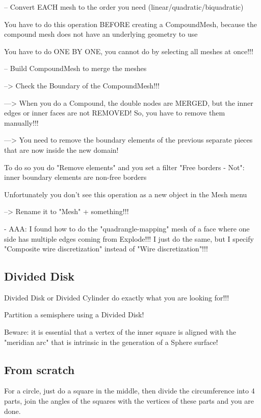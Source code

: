 \documentclass[10pt]{book}
\begin{document}
-- Convert EACH mesh to the order you need (linear/quadratic/biquadratic)

  You have to do this operation BEFORE creating a CompoundMesh,
  because the compound mesh does not have an underlying geometry to use 
   
  You have to do ONE BY ONE, you cannot do by selecting all meshes at once!!! 

  
-- Build CompoundMesh to merge the meshes

     --> Check the Boundary of the CompoundMesh!!! 
     
     ---> When you do a Compound, the double nodes are MERGED, but the inner edges or inner faces are not REMOVED! So, you have to remove them manually!!!
     
     ---> You need to remove the boundary elements of the previous separate pieces that are now inside the new domain!
     
          To do so you do "Remove elements" and you set a filter "Free borders - Not": inner boundary elements are non-free borders
          
          Unfortunately you don't see this operation as a new object in the Mesh menu
          
     --> Rename it to "Mesh" + something!!!
     
 
- AAA: I found how to do the "quadrangle-mapping" mesh of a face where one side has multiple edges coming from Explode!!! 
  I just do the same, but I specify "Composite wire discretization" instead of "Wire discretization"!!!
    
 

\subsection{Divided Disk}

Divided Disk or Divided Cylinder do exactly what you are looking for!!!

Partition a semisphere using a Divided Disk!

Beware: it is essential that a vertex of the inner square is aligned with the "meridian arc" that is intrinsic in the generation of a Sphere surface!

\subsection{From scratch}

For a circle, just do a square in the middle, then divide the circumference into 4 parts,
join the angles of the squares with the vertices of these parts and you are done.
\end{document}
